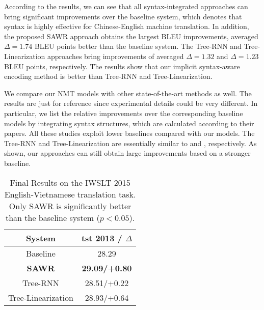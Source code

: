 \documentclass[11pt,a4paper]{article}
\begin{document}
\begin{CJK}{UTF8}{gbsn}
According to the results, we can see that all syntax-integrated approaches can bring significant improvements over the baseline system,
which denotes that syntax is highly effective for Chinese-English machine translation.
In addition, the proposed SAWR approach obtains the largest BLEU improvements,
averaged $\Delta =1.74$ BLEU points better than the baseline system.
The Tree-RNN and Tree-Linearization approaches bring improvements of averaged $\Delta =1.32$  and
$\Delta =1.23$ BLEU points, respectively.
The results show that our implicit syntax-aware encoding method is better than Tree-RNN and Tree-Linearization.




We compare our NMT models with other state-of-the-art methods as well.
The results are just for reference since experimental details could be very different.
In particular, we list the relative improvements over the corresponding baseline models by integrating syntax structures, which are calculated according to their papers.
All these studies exploit lower baselines compared with our models.
The Tree-RNN and Tree-Linearization are essentially similar to  and  , respectively.
As shown, our approaches can still obtain large improvements based on a stronger baseline.

\setlength{\tabcolsep}{6.0pt}
\begin{table}[t]
\begin{center}
\begin{tabular}{c|c}
	\hline
	System & tst 2013 / $\Delta$  \\ \hline
	Baseline &   28.29  \\ \hline
    \textbf{SAWR} &    \bf 29.09/+0.80       \\
	Tree-RNN &   28.51/+0.22   \\
    Tree-Linearization &  28.93/+0.64      \\
    \hline
\end{tabular}
\caption{Final Results on the IWSLT 2015 English-Vietnamese translation task. Only SAWR is significantly better than the baseline system ($p < 0.05$). }
\label{table:germany:result}
\end{center}
\end{table}




\end{CJK}
\end{document}
